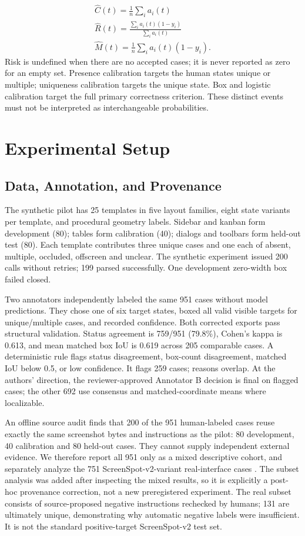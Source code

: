 \documentclass[10pt]{article}
\begin{document}
\begin{equation}
\begin{gathered}\widehat C(t)=\frac{1}{n}\sum_i a_i(t)\\[3pt]\widehat R(t)=\frac{\sum_i a_i(t)(1-y_i)}{\sum_i a_i(t)}\\[3pt]\widehat M(t)=\frac{1}{n}\sum_i a_i(t)(1-y_i).\end{gathered}
\label{eq:2}
\end{equation}
Risk is undefined when there are no accepted cases; it is never reported as zero for an empty set. Presence calibration targets the human states unique or multiple; uniqueness calibration targets the unique state. Box and logistic calibration target the full primary correctness criterion. These distinct events must not be interpreted as interchangeable probabilities.

\section{Experimental Setup}
\subsection{Data, Annotation, and Provenance}
The synthetic pilot has 25 templates in five layout families, eight state variants per template, and procedural geometry labels. Sidebar and kanban form development (80); tables form calibration (40); dialogs and toolbars form held-out test (80). Each template contributes three unique cases and one each of absent, multiple, occluded, offscreen and unclear. The synthetic experiment issued 200 calls without retries; 199 parsed successfully. One development zero-width box failed closed.

Two annotators independently labeled the same 951 cases without model predictions. They chose one of six target states, boxed all valid visible targets for unique/multiple cases, and recorded confidence. Both corrected exports pass structural validation. Status agreement is 759/951 (79.8\%), Cohen's kappa is 0.613, and mean matched box IoU is 0.619 across 205 comparable cases. A deterministic rule flags status disagreement, box-count disagreement, matched IoU below 0.5, or low confidence. It flags 259 cases; reasons overlap. At the authors' direction, the reviewer-approved Annotator B decision is final on flagged cases; the other 692 use consensus and matched-coordinate means where localizable.

An offline source audit finds that 200 of the 951 human-labeled cases reuse exactly the same screenshot bytes and instructions as the pilot: 80 development, 40 calibration and 80 held-out cases. They cannot supply independent external evidence. We therefore report all 951 only as a mixed descriptive cohort, and separately analyze the 751 ScreenSpot-v2-variant real-interface cases \cite{ref8}. The subset analysis was added after inspecting the mixed results, so it is explicitly a post-hoc provenance correction, not a new preregistered experiment. The real subset consists of source-proposed negative instructions rechecked by humans; 131 are ultimately unique, demonstrating why automatic negative labels were insufficient. It is not the standard positive-target ScreenSpot-v2 test set.
\end{document}
